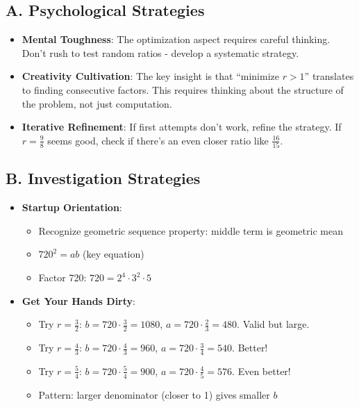 \documentclass[11pt]{article}
\begin{document}
\begin{strategicbox}
\subsection*{A. Psychological Strategies}
\begin{itemize}[leftmargin=*]
    \item \textbf{Mental Toughness}: The optimization aspect requires careful thinking. Don't rush to test random ratios - develop a systematic strategy.
    
    \item \textbf{Creativity Cultivation}: The key insight is that ``minimize $r > 1$'' translates to finding consecutive factors. This requires thinking about the structure of the problem, not just computation.
    
    \item \textbf{Iterative Refinement}: If first attempts don't work, refine the strategy. If $r = \frac{9}{8}$ seems good, check if there's an even closer ratio like $\frac{16}{15}$.
\end{itemize}

\subsection*{B. Investigation Strategies}
\begin{itemize}[leftmargin=*]
    \item \textbf{Startup Orientation}: 
    \begin{itemize}
        \item Recognize geometric sequence property: middle term is geometric mean
        \item $720^2 = ab$ (key equation)
        \item Factor 720: $720 = 2^4 \cdot 3^2 \cdot 5$
    \end{itemize}
    
    \item \textbf{Get Your Hands Dirty}: 
    \begin{itemize}
        \item Try $r = \frac{3}{2}$: $b = 720 \cdot \frac{3}{2} = 1080$, $a = 720 \cdot \frac{2}{3} = 480$. Valid but large.
        \item Try $r = \frac{4}{3}$: $b = 720 \cdot \frac{4}{3} = 960$, $a = 720 \cdot \frac{3}{4} = 540$. Better!
        \item Try $r = \frac{5}{4}$: $b = 720 \cdot \frac{5}{4} = 900$, $a = 720 \cdot \frac{4}{5} = 576$. Even better!
        \item Pattern: larger denominator (closer to 1) gives smaller $b$
    \end{itemize}
    

\end{itemize}
\end{strategicbox}
\end{document}
